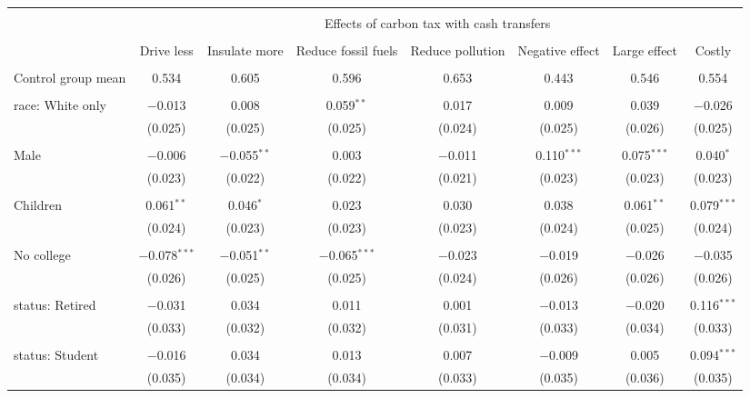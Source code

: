 
\begin{tabular}{@{\extracolsep{5pt}}lccccccc} 
\\[-1.8ex]\hline 
\hline \\[-1.8ex] 
 & \multicolumn{7}{c}{Effects of carbon tax with cash transfers} \\ 
\cline{2-8} 
\\[-1.8ex] & Drive less & Insulate more & Reduce fossil fuels & Reduce pollution & Negative effect & Large effect & Costly \\ 
\hline \\[-1.8ex] 
 Control group mean & 0.534 & 0.605 & 0.596 & 0.653 & 0.443 & 0.546 & 0.554  \\ \hline \\[-1.8ex] race: White only & $-$0.013 & 0.008 & 0.059$^{**}$ & 0.017 & 0.009 & 0.039 & $-$0.026 \\ 
  & (0.025) & (0.025) & (0.025) & (0.024) & (0.025) & (0.026) & (0.025) \\ 
  & & & & & & & \\ 
 Male & $-$0.006 & $-$0.055$^{**}$ & 0.003 & $-$0.011 & 0.110$^{***}$ & 0.075$^{***}$ & 0.040$^{*}$ \\ 
  & (0.023) & (0.022) & (0.022) & (0.021) & (0.023) & (0.023) & (0.023) \\ 
  & & & & & & & \\ 
 Children & 0.061$^{**}$ & 0.046$^{*}$ & 0.023 & 0.030 & 0.038 & 0.061$^{**}$ & 0.079$^{***}$ \\ 
  & (0.024) & (0.023) & (0.023) & (0.023) & (0.024) & (0.025) & (0.024) \\ 
  & & & & & & & \\ 
 No college & $-$0.078$^{***}$ & $-$0.051$^{**}$ & $-$0.065$^{***}$ & $-$0.023 & $-$0.019 & $-$0.026 & $-$0.035 \\ 
  & (0.026) & (0.025) & (0.025) & (0.024) & (0.026) & (0.026) & (0.026) \\ 
  & & & & & & & \\ 
 status: Retired & $-$0.031 & 0.034 & 0.011 & 0.001 & $-$0.013 & $-$0.020 & 0.116$^{***}$ \\ 
  & (0.033) & (0.032) & (0.032) & (0.031) & (0.033) & (0.034) & (0.033) \\ 
  & & & & & & & \\ 
 status: Student & $-$0.016 & 0.034 & 0.013 & 0.007 & $-$0.009 & 0.005 & 0.094$^{***}$ \\ 
  & (0.035) & (0.034) & (0.034) & (0.033) & (0.035) & (0.036) & (0.035) \\ 

\end{tabular}
